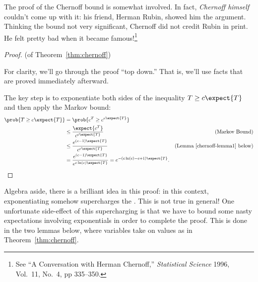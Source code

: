The proof of the Chernoff bound is somewhat involved.  In fact,
\emph{Chernoff himself} couldn't come up with it: his friend,
 Herman Rubin, showed him the argument.
Thinking the bound not very significant, Chernoff did not credit Rubin
in print.  He felt pretty bad when it became famous!\footnote{See ``A
  Conversation with Herman Chernoff,'' \emph{Statistical Science}
  1996, Vol.~11, No.~4, pp 335--350.}

\iffalse

Here is the theorem again, for reference:

\begin{theorem}[\idx{Chernoff Bound}]
Let $T_1, \dots, T_n$ be mutually independent random variables such
that $0 \leq T_i \leq 1$ for all $i$.  Let $T = T_1 + \cdots + T_n$.
Then for all $c \geq 1$,
\begin{equation}
\prob{T \geq c \expect{T}} \leq e^{-k \expect{T}}
\tag{\ref{chernoff-leq}}
\end{equation}
where $\beta(c) \eqdef c \ln(c) - c + 1$.
\end{theorem}
\fi

\begin{proof} (of Theorem~\ref{thm:chernoff})

For clarity, we'll go through the proof ``top down.''  That is, we'll
use facts that are proved immediately afterward.

The key step is to exponentiate both sides of the inequality $T \ge c
\expect{T}$ and then apply the Markov bound:
\begingroup
\openup\jot
\begin{align*}
\prob{T \geq c \expect{T}} & = \prob{c^T \geq c^{c \expect{T}}} \\
  & \leq \frac{\expect{c^T}}{c^{c \expect{T}}} & \text{(Markov Bound)}\\
  & \leq \frac{e^{(c-1) \expect{T}}}{c^{c \expect{T}}}
         & \text{(Lemma~\ref{chernoff-lemma1} below)}\\
  & = \frac{e^{(c-1) \expect{T}}}{e^{c \ln(c) \expect{T}}} = e^{- (c \ln(c) - c + 1) \expect{T}}.
\end{align*}
\endgroup
\end{proof}

Algebra aside, there is a brilliant idea in this proof: in this
context, exponentiating somehow supercharges the .
This is not true in general!  One unfortunate side-effect of this
supercharging is that we have to bound some nasty expectations
involving exponentials in order to complete the proof.  This is done
in the two lemmas below, where variables take on values as in
Theorem~\ref{thm:chernoff}.

